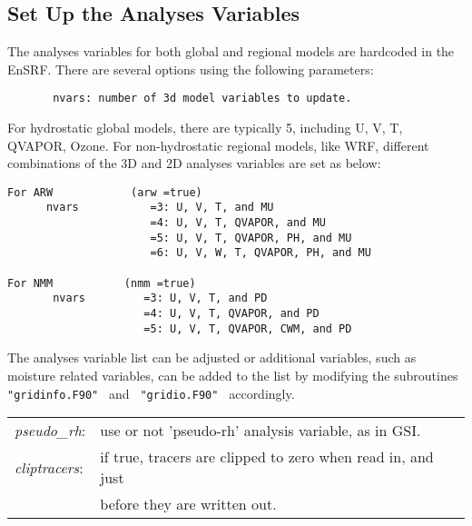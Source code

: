 \subsection{Set Up the Analyses Variables}

The analyses variables for both global and regional models are hardcoded in the EnSRF. There are several options using the following parameters:
\begin{footnotesize}
\begin{verbatim}
       nvars: number of 3d model variables to update.
\end{verbatim}
\end{footnotesize}
For hydrostatic global models, there are typically 5, including U, V, T, QVAPOR, Ozone. For non-hydrostatic regional models, like WRF, different combinations of the 3D and 2D analyses variables are set as below:
\begin{footnotesize}
\begin{verbatim}
For ARW            (arw =true)
      nvars           =3: U, V, T, and MU
                      =4: U, V, T, QVAPOR, and MU
                      =5: U, V, T, QVAPOR, PH, and MU 
                      =6: U, V, W, T, QVAPOR, PH, and MU

For NMM           (nmm =true)
       nvars         =3: U, V, T, and PD
                     =4: U, V, T, QVAPOR, and PD
                     =5: U, V, T, QVAPOR, CWM, and PD
\end{verbatim}
\end{footnotesize}

The analyses variable list can be adjusted or additional variables, such as moisture related variables, can be added to the list by modifying the subroutines \verb| "gridinfo.F90" | and \verb| "gridio.F90" | accordingly.

\begin{table}[htbp]
\centering
\begin{tabular}{ll}
\textit{pseudo\_rh}:  & use or not 'pseudo-rh' analysis variable, as in GSI. \\
\textit{cliptracers}:   &  if true, tracers are clipped to zero when read in, and just  \\
                     & before they are written out. \\                
\end{tabular}
\end{table}


